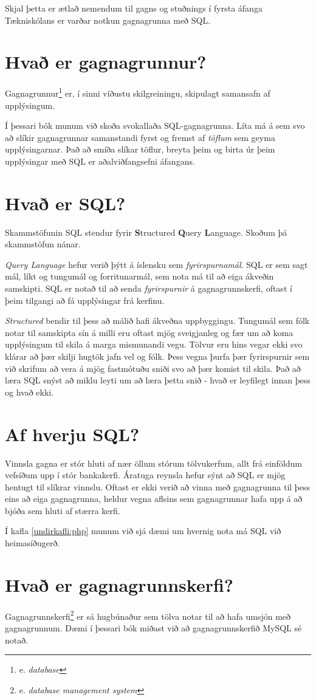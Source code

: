 Skjal þetta er ætlað nemendum til gagns og stuðnings í fyrsta áfanga Tækniskólans er varðar notkun gagnagrunna með SQL.
\section{Hvað er gagnagrunnur?}
Gagnagrunnur\footnote{e. \emph{database}} er, í sinni víðustu skilgreiningu, skipulagt samansafn af upplýsingum.

Í þessari bók munum við skoða svokallaða SQL-gagnagrunna.
Líta má á sem svo að slíkir gagnagrunnar samanstandi fyrst og fremst af \emph{töflum} sem geyma upplýsingarnar. Það að smíða slíkar töflur, breyta þeim og birta úr þeim upplýsingar með SQL er aðalviðfangsefni áfangans.
\section{Hvað er SQL?}
Skammstöfunin SQL stendur fyrir \textbf{S}tructured \textbf{Q}uery \textbf{L}anguage. Skoðum þá skammstöfun nánar.

\emph{Query Language} hefur verið þýtt á íslensku sem \emph{fyrirspurnamál}. SQL er sem sagt mál, líkt og tungumál og forritunarmál, sem nota má til að eiga ákveðin samskipti. SQL er notað til að senda \emph{fyrirspurnir} á gagnagrunnskerfi, oftast í þeim tilgangi að fá upplýsingar frá kerfinu.

\emph{Structured} bendir til þess að málið hafi ákveðna uppbyggingu. Tungumál sem fólk notar til samskipta sín á milli eru oftast mjög sveigjanleg og fær um að koma upplýsingum til skila á marga mismunandi vegu. Tölvur eru hins vegar ekki svo klárar að þær skilji hugtök jafn vel og fólk. Þess vegna þurfa þær fyrirspurnir sem við skrifum að vera á mjög fastmótuðu sniði svo að þær komist til skila. Það að læra SQL snýst að miklu leyti um að læra þetta snið - hvað er leyfilegt innan þess og hvað ekki.
\section{Af hverju SQL?}
Vinnsla gagna er stór hluti af nær öllum stórum tölvukerfum, allt frá einföldum vefsíðum upp í stór bankakerfi. Áratuga reynsla hefur sýnt að SQL er mjög hentugt til slíkrar vinnslu. Oftast er ekki verið að vinna með gagnagrunna til þess eins að eiga gagnagrunna, heldur vegna aflsins sem gagnagrunnar hafa upp á að bjóða sem hluti af stærra kerfi.

Í kafla \ref{undirkafli:php} munum við sjá dæmi um hvernig nota má SQL við heimasíðugerð.
\section{Hvað er gagnagrunnskerfi?}
\label{undirkafli:gagnagrunnskerfi}
Gagnagrunnskerfi\footnote{e. \emph{database management system}} er sá hugbúnaður sem tölva notar til að hafa umsjón með gagnagrunnum. Dæmi í þessari bók miðast við að gagnagrunnskerfið MySQL sé notað.

